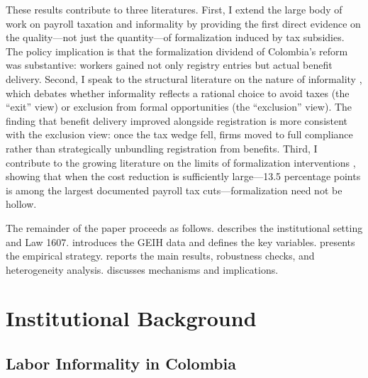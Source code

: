 \documentclass[12pt]{article}
\begin{document}
These results contribute to three literatures. First, I extend the large body of work on payroll taxation and informality \citep{gruber1997incidence, kugler2009effects, kugler2017effects, bernal2017payroll, morales2017effect, betcherman2019payroll} by providing the first direct evidence on the quality---not just the quantity---of formalization induced by tax subsidies. The policy implication is that the formalization dividend of Colombia's reform was substantive: workers gained not only registry entries but actual benefit delivery. Second, I speak to the structural literature on the nature of informality \citep{levy2008good, laporta2014informality, ulyssea2018firms, maloney2004informality, meghir2015wages, bobba2021labor}, which debates whether informality reflects a rational choice to avoid taxes (the ``exit'' view) or exclusion from formal opportunities (the ``exclusion'' view). The finding that benefit delivery improved alongside registration is more consistent with the exclusion view: once the tax wedge fell, firms moved to full compliance rather than strategically unbundling registration from benefits. Third, I contribute to the growing literature on the limits of formalization interventions \citep{galiani2012tax, almeida2012enforcement, dix2021trade, kanbur2017informality}, showing that when the cost reduction is sufficiently large---13.5 percentage points is among the largest documented payroll tax cuts---formalization need not be hollow.

The remainder of the paper proceeds as follows.  describes the institutional setting and Law 1607.  introduces the GEIH data and defines the key variables.  presents the empirical strategy.  reports the main results, robustness checks, and heterogeneity analysis.  discusses mechanisms and implications.

\section{Institutional Background}
\label{sec:background}

\subsection{Labor Informality in Colombia}
\end{document}
